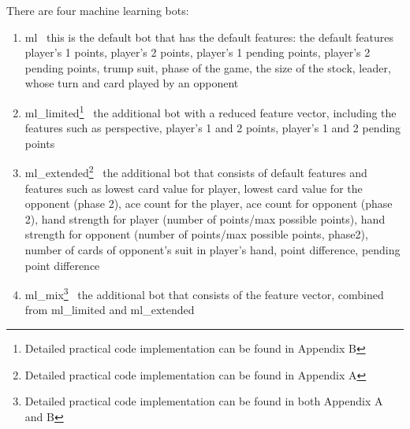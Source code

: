 \documentclass[master]{subfiles}
\begin{document}
\noindent There are four machine learning bots:
\begin{enumerate}
\item ml \textemdash \ this is the default bot that has the default features: the default features player’s 1 points, player’s 2 points, player’s 1 pending points, player’s 2 pending points, trump suit, phase of the game, the size of the stock, leader, whose turn and card played by an opponent
\item ml\_limited\footnote{Detailed practical code implementation can be found in Appendix B} \textemdash \ the additional bot with a reduced feature vector, including the features such as perspective, player’s 1 and 2 points, player’s 1 and 2 pending points
\item ml\_extended\footnote{Detailed practical code implementation can be found in Appendix A}  \textemdash \ the additional bot that consists of default features and features such as lowest card value for player, lowest card value for the opponent (phase 2), ace count for the player, ace count for opponent (phase 2), hand strength for player (number of points/max possible points), hand strength for opponent (number of points/max possible points, phase2), number of cards of opponent's suit in player's hand, point difference, pending point difference
\item ml\_mix\footnote{Detailed practical code implementation can be found in both Appendix A and B}  \textemdash \ the additional bot that consists of the feature vector, combined from ml\_limited and ml\_extended
\end{enumerate}
\end{document}
